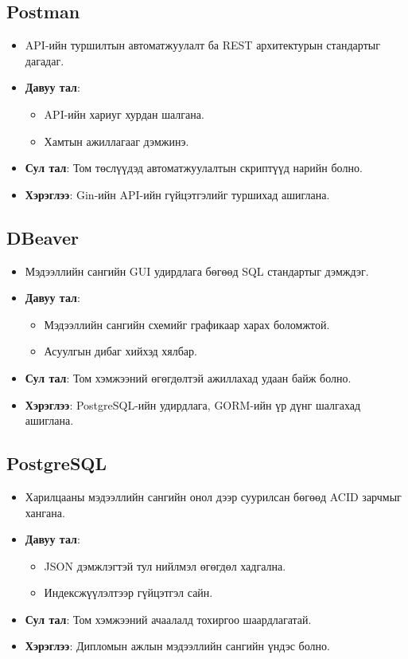 \subsection{Postman}
\begin{itemize}
    \item API-ийн туршилтын автоматжуулалт ба REST архитектурын стандартыг дагадаг.
    \item \textbf{Давуу тал}: 
    \begin{itemize}
        \item API-ийн хариуг хурдан шалгана.
        \item Хамтын ажиллагааг дэмжинэ.
    \end{itemize}
    \item \textbf{Сул тал}: Том төслүүдэд автоматжуулалтын скриптүүд нарийн болно.
    \item \textbf{Хэрэглээ}: Gin-ийн API-ийн гүйцэтгэлийг туршихад ашиглана.
\end{itemize}

\subsection{DBeaver}
\begin{itemize}
    \item Мэдээллийн сангийн GUI удирдлага бөгөөд SQL стандартыг дэмждэг.
    \item \textbf{Давуу тал}: 
    \begin{itemize}
        \item Мэдээллийн сангийн схемийг графикаар харах боломжтой.
        \item Асуулгын дибаг хийхэд хялбар.
    \end{itemize}
    \item \textbf{Сул тал}: Том хэмжээний өгөгдөлтэй ажиллахад удаан байж болно.
    \item \textbf{Хэрэглээ}: PostgreSQL-ийн удирдлага, GORM-ийн үр дүнг шалгахад ашиглана.
\end{itemize}

\subsection{PostgreSQL}
\begin{itemize}
    \item Харилцааны мэдээллийн сангийн онол дээр суурилсан бөгөөд ACID зарчмыг хангана.
    \item \textbf{Давуу тал}: 
    \begin{itemize}
        \item JSON дэмжлэгтэй тул нийлмэл өгөгдөл хадгална.
        \item Индексжүүлэлтээр гүйцэтгэл сайн.
    \end{itemize}
    \item \textbf{Сул тал}: Том хэмжээний ачаалалд тохиргоо шаардлагатай.
    \item \textbf{Хэрэглээ}: Дипломын ажлын мэдээллийн сангийн үндэс болно.
\end{itemize}

